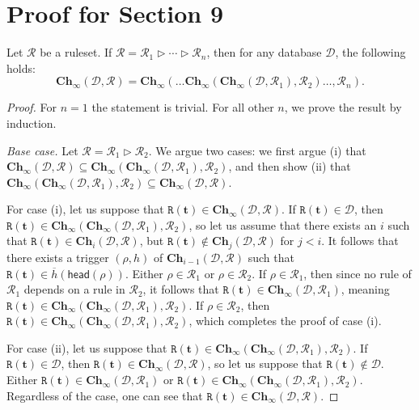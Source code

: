 \documentclass[10pt,a4paper]{amsart}
\theoremstyle{definition}
\numberwithin{equation}{section}
\providecommand{\sa}{\mathbf{Ch}_{\infty}}
\theoremstyle{plain}
\theoremstyle{definition}
\theoremstyle{myexample}
\theoremstyle{plain}
\newenvironment{customlem}[1]
  {\renewcommand\theinnercustomlem{#1}\innercustomlem}
  {\endinnercustomlem}
\theoremstyle{definition}
\renewcommand{\vec}[1]{\boldsymbol{#1}}
\newcommand{\database}{\mathcal{D}}
\newcommand{\db}{\database}
\newcommand{\cut}{\triangleright}
\newcommand{\head}{\fcn{head}}
\newcommand{\fcn}[1]{\mathsf{#1}}
\newcommand{\ruleset}{\calr}
\newcommand{\chase}{\mathbf{Ch}}
\renewcommand{\sa}{\mathbf{Ch}_{\infty}}
\newcommand{\calr}{\mathcal{R}}
\newcommand{\pred}[1]{\mathtt{#1}}
\newcommand{\rpred}{\pred{R}}
\begin{document}
\section{Proof for Section 9}

\begin{customlem}{\ref{lem:n-cut-layered-chase}}
Let $\ruleset$ be a ruleset. If $\ruleset = \ruleset_{1} \cut \cdots \cut \ruleset_{n}$, then for any database $\db$, the following holds:
$$
\sa(\db,\ruleset) = \sa(\ldots\sa(\sa(\db,\ruleset_{1}),\ruleset_{2}) \ldots, \ruleset_{n}).
$$
\end{customlem}

\begin{proof} For $n=1$ the statement is trivial. For all other $n$, we prove the result by induction.

\textit{Base case.} Let $\ruleset = \ruleset_{1} \cut \ruleset_{2}$. We argue two cases: we first argue (i) that $\sa(\db,\ruleset) \subseteq \sa(\sa(\db,\ruleset_{1}),\ruleset_{2})$, and then show (ii) that $\sa(\sa(\db,\ruleset_{1}),\ruleset_{2}) \subseteq \sa(\db,\ruleset)$. 

For case (i), let us suppose that $\rpred(\vec{t}) \in \sa(\db,\ruleset)$. If $\rpred(\vec{t}) \in \db$, then $\rpred(\vec{t}) \in \sa(\sa(\db,\ruleset_{1}),\ruleset_{2})$, so let us assume that there exists an $i$ such that $\rpred(\vec{t}) \in \chase_{i}(\db,\ruleset)$, but $\rpred(\vec{t}) \not\in \chase_{j}(\db,\ruleset)$ for $j < i$. It follows that there exists a trigger $(\rho,h)$ of $\chase_{i-1}(\db,\ruleset)$ such that $\rpred(\vec{t}) \in \overline{h}(\head(\rho))$. Either $\rho \in \ruleset_{1}$ or $\rho \in \ruleset_{2}$. If $\rho \in \ruleset_{1}$, then since no rule of $\ruleset_{1}$ depends on a rule in $\ruleset_{2}$, it follows that $\rpred(\vec{t}) \in \sa(\db,\ruleset_{1})$, meaning $\rpred(\vec{t}) \in \sa(\sa(\db,\ruleset_{1}),\ruleset_{2})$. If $\rho \in \ruleset_{2}$, then $\rpred(\vec{t}) \in \sa(\sa(\db,\ruleset_{1}),\ruleset_{2})$, which completes the proof of case (i). 

For case (ii), let us suppose that $\rpred(\vec{t}) \in \sa(\sa(\db,\ruleset_{1}),\ruleset_{2})$. If $\rpred(\vec{t}) \in \db$, then $\rpred(\vec{t}) \in \sa(\db,\ruleset)$, so let us suppose that $\rpred(\vec{t}) \not\in \db$. Either $\rpred(\vec{t}) \in \sa(\db,\ruleset_{1})$ or $\rpred(\vec{t}) \in \sa(\sa(\db,\ruleset_{1}),\ruleset_{2})$. Regardless of the case, one can see that $\rpred(\vec{t}) \in \sa(\db,\ruleset)$.


\end{proof}
\end{document}
